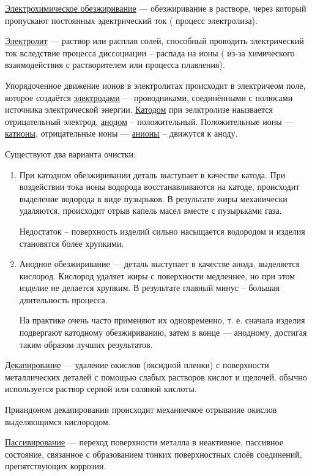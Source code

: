 \documentclass{article}
\begin{document}
\underline{Электрохимическое обезжиривание} --- обезжиривание в растворе, через который пропускают постоянных эдектрический ток ( процесс электролиза).

\underline{Электролит} --- раствор или расплав солей, способный проводить электрический ток вследствие процесса диссоциации -- распада на ионы ( из-за химического взаимодействия с растворителем или процесса плавления).

Упорядоченное движение ионов в электролитах происходит в электричеом поле, которое создаётся \underline{электродами} --- проводниками, соединёнными с полюсами источника электрической энергии. \underline{Катодом}  при эелктролизе наызвается отрицательный электрод, \underline{анодом}  -- положительный. Положительные ионы --- \underline{катионы}, отрицательные ионы --- \underline{анионы} -- движутся к аноду.

Существуют два варианта очистки:
\begin{enumerate}
	\item При катодном обезжиривании деталь выступает в качестве катода.
	При воздействии тока ионы водорода восстанавливаются на катоде, происходит выделение водорода в виде пузырьков. В результате жиры механически удаляются, происходит отрыв капель масел вместе с пузырьками газа.

	Недостаток -- поверхность изделий сильно насыщается  водородом и изделия становятся более хрупкими.
	\item Анодное обезжиривание --- деталь выступает в качестве анода, выделяется кислород. Кислород удаляет жиры с поверхности медленнее, но при этом изделие не делается хрупким. В результате главный минус -- большая длительность процесса.

На практике очень часто применяют их одновременно, т. е. сначала изделия подвергают катодному обезжириванию, затем в конце --- анодному, достигая таким образом лучших результатов.
\end{enumerate}
\underline{Декапирование} --- удаление окислов (оксидной пленки) с поверхности металлических деталей с помощью слабых растворов кислот и щелочей. обычно используется раствор серной или соляной кислоты.

Приандоном декапировании происходит механиечкое отрывание окислов выделяющимся кислородом.

\underline{Пассивирование} --- переход поверхности металла в неактивное, пассивное состояние, связанное с образованием тонких поверхностных слоёв соединений, препятствующих коррозии.
\end{document}
